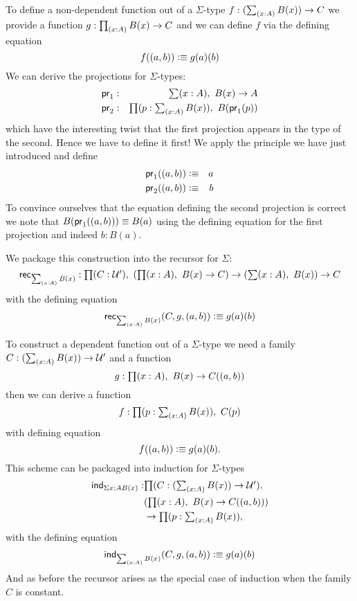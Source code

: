 To define a non-dependent function out of a $\Sigma$-type
$f : (\sm{x:A} B(x)) \to C$ we provide a function 
$g : \prd{x:A} B(x) \to C$ and we can define $f$ via the defining
equation
\[ f(( a,b)) \vcentcolon\equiv g(a)(b) \]
We can derive the projections for $\Sigma$-types:
\begin{eqnarray*}
  \fst & : & \sm{x : A}B(x) \to A \\
  \snd & : & \prd{p:\sm{x : A}B(x)}B(\fst(p))
\end{eqnarray*}
which have the interesting twist that the first projection appears
in the type of the second. Hence we have to define it first!
We apply the principle we have just introduced and define
\begin{eqnarray*}
  \mathsf{pr}_{1}(( a,b)) & \vcentcolon\equiv & a \\
  \mathsf{pr}_{2}(( a,b)) & \vcentcolon\equiv & b
\end{eqnarray*}
To convince ourselves that the equation defining the second
projection is correct we note that $B (\mathsf{pr}_{1}(( a,b))) \equiv
B(a)$ using the defining equation for the first projection and
indeed $b : B(a)$. 

We package this construction into the recursor for $\Sigma$:
\[ \rec{\sm{x:A}B(x)} : \prd{C:\UU'}(\prd{x:A} B(x) \to C) \to
(\sm{x:A}B(x)) \to C \]
with the defining equation
\[ \rec{\sm{x:A}B(x)}(C,g,\tup{a}{b}) \defeq g(a)(b) \]

To construct a dependent function out of a $\Sigma$-type we 
need a family $C : (\sm{x:A} B(x)) \to \UU'$ and a function
\[ g : \prd{x:A} B(x) \to C(\tup{a}{b}) \]
then we can derive a function 
\[ f : \prd{p : \sm{x:A}B(x)} C(p) \]
with  defining equation
\[ f(( a,b)) \vcentcolon\equiv g(a)(b).\]
This scheme can be packaged into induction for $\Sigma$-types
\begin{align*}
  \ind{\Sigma{x:A}B(x)} : & \prd{C:(\sm{x:A} B(x)) \to \UU'}\\
   & (\prd{x:A} B(x) \to C(\tup{a}{b})) \\
   & \to \prd{p : \sm{x:A}B(x)}
\end{align*}
with the defining equation 
\[ \ind{\sm{x:A}B(x)}(C,g,\tup{a}{b}) \defeq g(a)(b) \]
And as before the recursor arises as the special case of induction
when the family $C$ is constant.

